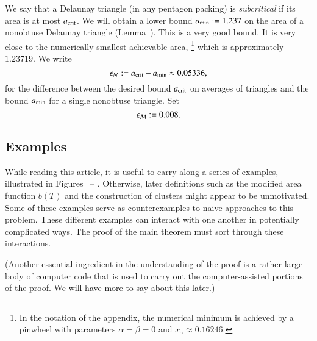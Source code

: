 We say that a Delaunay triangle (in any pentagon packing) is {\it
  subcritical} if its area is at most $a_\text{crit}$.  We will obtain a
lower bound $a_\text{min} := 1.237$ on the area of a nonobtuse Delaunay
triangle (Lemma~).  This is a very good bound.  It is
very close to the numerically smallest achievable area,%
\footnote{In the notation of the appendix, the
  numerical minimum is achieved by a pinwheel with parameters
  $\alpha=\beta=0$ and $x_\gamma\approx 0.16246$.}
%
 which is
approximately $1.23719$.  We write 
\begin{equation}\label{eqn:epsN}
\epsilon_{\mathcal N} :=
a_\text{crit} - a_\text{min} \approx 0.05336,
\end{equation} for the difference between the desired
bound $a_\text{crit}$ on averages of triangles and the bound $a_\text{min}$ for a
single nonobtuse triangle.  Set
\begin{equation}\label{eqn:epsM}
\epsilon_{\mathcal M} := 0.008.
\end{equation}

\subsection{Examples}

While reading this article, it is useful to carry along a series of examples,
illustrated in Figures~ -- .
Otherwise, later definitions such as the modified area function $b(T)$
and the construction of clusters might appear to be unmotivated.  Some
of these examples serve as counterexamples to naive approaches to this
problem.  These different examples can interact with one another in
potentially complicated ways.  The proof of the main theorem must sort
through these interactions.

(Another essential ingredient in the understanding of the proof is a
rather large body of computer code that is used to carry out the
computer-assisted portions of the proof.  We will have more to say
about this later.)



